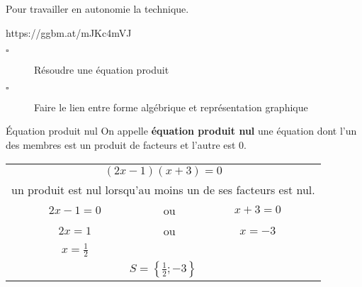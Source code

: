 \documentclass[openany]{book}
\begin{document}
\Exe

Pour travailler en autonomie la technique.

https://ggbm.at/mJKc4mVJ


\Exe





\begin{seance}

\begin{description}
\item[$\square$] Résoudre une équation produit
\item[$\square$] Faire le lien entre forme algébrique et représentation graphique
\end{description}
\end{seance}

\begin{DefT}{Équation produit nul}
On appelle \textbf{équation produit nul} une équation dont l'un des membres est un produit de facteurs et l'autre est 0. 
\end{DefT}


\begin{Mt}

\begin{tabular}{ccc}
\multicolumn{3}{c}{$(2x-1)(x+3)=0$} \\ 
\multicolumn{3}{c}{un produit est nul lorsqu'au moins un de ses facteurs est nul. }\\  
$2x-1=0$ & ou & $x+3=0$ \\  
$2x=1$ & ou & $x=-3$ \\ 
$x=\frac{1}{2}$ &  &  \\ 
\multicolumn{3}{c}{$S=\left\lbrace \frac{1}{2}; -3 \right\rbrace $}\\  
\end{tabular} 
\end{Mt}

\Exe



\Exe


\Exe


\Exe

\end{document}
